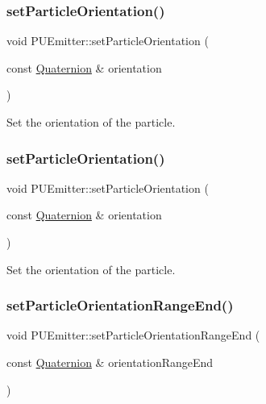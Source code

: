 \subsubsection{\texorpdfstring{set\+Particle\+Orientation()}{setParticleOrientation()}\hspace{0.1cm}{\footnotesize\ttfamily [1/2]}}
{\footnotesize\ttfamily void P\+U\+Emitter\+::set\+Particle\+Orientation (\begin{DoxyParamCaption}\item[{const \hyperlink{classQuaternion}{Quaternion} \&}]{orientation }\end{DoxyParamCaption})}

Set the orientation of the particle. \mbox{\label{classPUEmitter_ab71781433c3f2547008a71de464d615a}} 
\subsubsection{\texorpdfstring{set\+Particle\+Orientation()}{setParticleOrientation()}\hspace{0.1cm}{\footnotesize\ttfamily [2/2]}}
{\footnotesize\ttfamily void P\+U\+Emitter\+::set\+Particle\+Orientation (\begin{DoxyParamCaption}\item[{const \hyperlink{classQuaternion}{Quaternion} \&}]{orientation }\end{DoxyParamCaption})}

Set the orientation of the particle. \mbox{\label{classPUEmitter_a4268d9ade8a9ff890397a2c74b0128b8}} 
\subsubsection{\texorpdfstring{set\+Particle\+Orientation\+Range\+End()}{setParticleOrientationRangeEnd()}\hspace{0.1cm}{\footnotesize\ttfamily [1/2]}}
{\footnotesize\ttfamily void P\+U\+Emitter\+::set\+Particle\+Orientation\+Range\+End (\begin{DoxyParamCaption}\item[{const \hyperlink{classQuaternion}{Quaternion} \&}]{orientation\+Range\+End }\end{DoxyParamCaption})}


